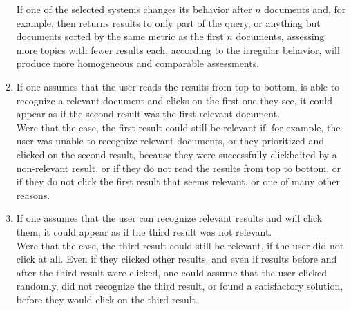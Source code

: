 \documentclass[10pt,a4paper]{article}
\begin{document}
\begin{enumerate}
        If one of the selected systems changes its behavior after $n$ documents and, for example, then returns results to only part of the query, or anything but documents sorted by the same metric as the first $n$ documents, assessing more topics with fewer results each, according to the irregular behavior,  will produce more homogeneous and comparable assessments.
    \item If one assumes that the user reads the results from top to bottom, is able to recognize a relevant document and clicks on the first one they see, it could appear as if the second result was the first relevant document.\\
    Were that the case, the first result could still be relevant if, for example, the user was unable to recognize relevant documents, or they prioritized and clicked on the second result, because they were successfully clickbaited by a non-relevant result, or if they do not read the results from top to bottom, or if they do not click the first result that seems relevant, or one of many other reasons.
    \item If one assumes that the user can recognize relevant results and will click them, it could appear as if the third result was not relevant.\\
    Were that the case, the third result could still be relevant, if the user did not click at all. Even if they clicked other results, and even if results before and after the third result were clicked, one could assume that the user clicked randomly, did not recognize the third result, or found a satisfactory solution, before they would click on the third result.
\end{enumerate}
\end{document}
